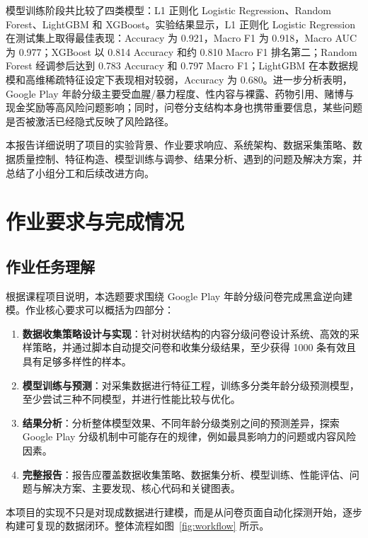 \documentclass[UTF8]{ctexart}
\begin{document}
模型训练阶段共比较了四类模型：L1 正则化 Logistic Regression、Random Forest、LightGBM 和 XGBoost。实验结果显示，L1 正则化 Logistic Regression 在测试集上取得最佳表现：Accuracy 为 0.921，Macro F1 为 0.918，Macro AUC 为 0.977；XGBoost 以 0.814 Accuracy 和约 0.810 Macro F1 排名第二；Random Forest 经调参后达到 0.783 Accuracy 和 0.797 Macro F1；LightGBM 在本数据规模和高维稀疏特征设定下表现相对较弱，Accuracy 为 0.680。进一步分析表明，Google Play 年龄分级主要受血腥/暴力程度、性内容与裸露、药物引用、赌博与现金奖励等高风险问题影响；同时，问卷分支结构本身也携带重要信息，某些问题是否被激活已经隐式反映了风险路径。

本报告详细说明了项目的实验背景、作业要求响应、系统架构、数据采集策略、数据质量控制、特征构造、模型训练与调参、结果分析、遇到的问题及解决方案，并总结了小组分工和后续改进方向。

\section{作业要求与完成情况}

\subsection{作业任务理解}

根据课程项目说明，本选题要求围绕 Google Play 年龄分级问卷完成黑盒逆向建模。作业核心要求可以概括为四部分：

\begin{enumerate}[leftmargin=2em]
  \item \textbf{数据收集策略设计与实现}：针对树状结构的内容分级问卷设计系统、高效的采样策略，并通过脚本自动提交问卷和收集分级结果，至少获得 1000 条有效且具有足够多样性的样本。
  \item \textbf{模型训练与预测}：对采集数据进行特征工程，训练多分类年龄分级预测模型，至少尝试三种不同模型，并进行性能比较与优化。
  \item \textbf{结果分析}：分析整体模型效果、不同年龄分级类别之间的预测差异，探索 Google Play 分级机制中可能存在的规律，例如最具影响力的问题或内容风险因素。
  \item \textbf{完整报告}：报告应覆盖数据收集策略、数据集分析、模型训练、性能评估、问题与解决方案、主要发现、核心代码和关键图表。
\end{enumerate}

本项目的实现不只是对现成数据进行建模，而是从问卷页面自动化探测开始，逐步构建可复现的数据闭环。整体流程如图~\ref{fig:workflow} 所示。
\end{document}
